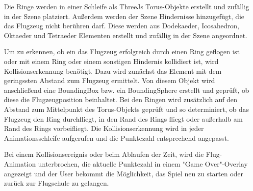 Die Ringe werden in einer Schleife als ThreeJs Torus-Objekte erstellt und zufällig in der Szene platziert.
Außerdem werden der Szene Hindernisse hinzugefügt, die das Flugzeug nicht berühren darf.
Diese werden aus Dodekaeder, Icosahedron, Oktaeder und Tetraeder Elementen erstellt und zufällig in der Szene angeordnet.

Um zu erkennen, ob ein das Flugzeug erfolgreich durch einen Ring geflogen ist oder mit einem Ring oder einem sonstigen Hindernis kollidiert ist, wird Kollisionserkennung benötigt.
Dazu wird zunächst das Element mit dem geringssten Abstand zum Flugzeug ermittelt.
Von diesem Objekt wird anschließend eine BoundingBox bzw. ein BoundingSphere erstellt und geprüft, ob diese die Flugzeugposition beinhaltet.
Bei den Ringen wird zusätzlich auf den Abstand zum Mittelpunkt des Torus-Objekts geprüft und so determiniert, ob das Flugzeug den Ring durchfliegt, in den Rand des Rings fliegt oder außerhalb am Rand des Rings vorbeifliegt.
Die Kollisionserkennung wird in jeder Animationsschleife aufgerufen und die Punktezahl entsprechend angepasst.

Bei einem Kollisionsereignis oder beim Ablaufen der Zeit, wird die Flug-Animation unterbrochen, die aktuelle Punktezahl in einem "Game Over"-Overlay angezeigt und der User bekommt die Möglichkeit, das Spiel neu zu starten oder zurück zur Flugschule zu gelangen.